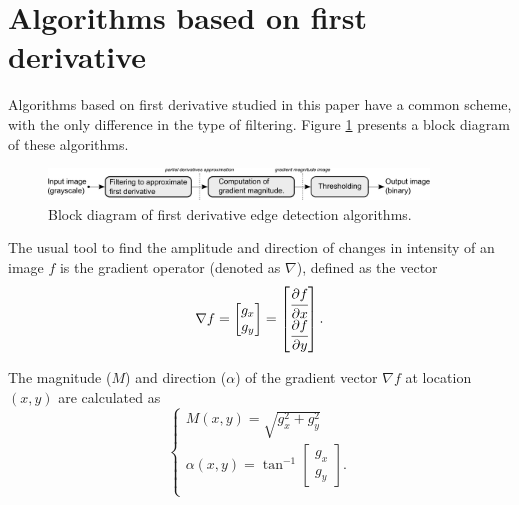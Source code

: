 \documentclass{ipol}
\numberwithin{equation}{section}
\numberwithin{table}{section}
\numberwithin{figure}{section}
\begin{document}
\nocite{IPOL}


\section{Algorithms based on first derivative}
\label{sec:first}

Algorithms based on first derivative studied in this paper have a common scheme, with 
the only difference in the type of filtering. Figure \ref{fig:blockdiagram1} presents
a block diagram of these algorithms. \\

\begin{figure}[!h]
	\centering
	\includegraphics[width=0.9\textwidth]{blockdiagram1.pdf}
	\caption{Block diagram of first derivative edge detection algorithms.}
	\label{fig:blockdiagram1}
\end{figure}

The usual tool to find the amplitude and direction of changes in 
intensity of an image $f$ is the gradient operator (denoted as $\nabla$), defined 
as the vector
\begin{equation}
	\nabla f = 
				\begin{bmatrix} 
					g_x \\ g_y
				\end{bmatrix}
	=				
				\begin{bmatrix} 
					\cfrac{\partial f}{\partial x} \\ \cfrac{\partial f}{\partial y} \\
				\end{bmatrix}.
\end{equation}

The magnitude ($M$) and direction ($\alpha$) of the gradient vector $\nabla f$ at location $(x,y)$
are calculated as
\begin{equation}
\label{eq:mag_alpha}
	\begin{cases}
		M(x,y) = \sqrt{g_x^2 + g_y^2} \\
		\alpha(x,y) = \tan^{-1} \begin{bmatrix} g_x \\ g_y \end{bmatrix} .\\
	\end{cases}
\end{equation}
\end{document}
